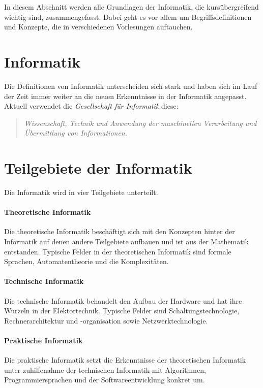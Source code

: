 \documentclass[../main.tex]{subfiles}
\begin{document}
    In diesem Abschnitt werden alle Grundlagen der Informatik, die kursübergreifend wichtig sind, zusammengefasst. Dabei geht es vor allem um Begriffsdefinitionen und Konzepte, die in verschiedenen Vorlesungen auftauchen.
    \clearpage

    \section{Informatik}
        Die Definitionen von Informatik unterscheiden sich stark und haben sich im Lauf der Zeit immer weiter an die neuen Erkenntnisse in der Informatik angepasst. Aktuell verwendet die \emph{Gesellschaft für Informatik} diese:
        
        \begin{quote}
            \emph{Wissenschaft, Technik und Anwendung der maschinellen Verarbeitung und Übermittlung von Informationen.}
        \end{quote}
        
    \section{Teilgebiete der Informatik}
        Die Informatik wird in vier Teilgebiete unterteilt.
        
        \paragraph{Theoretische Informatik}
            Die theoretische Informatik beschäftigt sich mit den Konzepten hinter der Informatik auf denen andere Teilgebiete aufbauen und ist aus der Mathematik entstanden. Typische Felder in der theoretischen Informatik sind formale Sprachen, Automatentheorie und die Komplexitäten.
            
        \paragraph{Technische Informatik}
            Die technische Informatik behandelt den Aufbau der Hardware und hat ihre Wurzeln in der Elektortechnik. Typische Felder sind Schaltungstechnologie, Rechnerarchitektur und -organisation sowie Netzwerktechnologie.
            
        \paragraph{Praktische Informatik}
            Die praktische Informatik setzt die Erkenntnisse der theoretischen Informatik unter zuhilfenahme der technischen Informatik mit Algorithmen, Programmiersprachen und der Softwareentwicklung konkret um.
            
\end{document}
